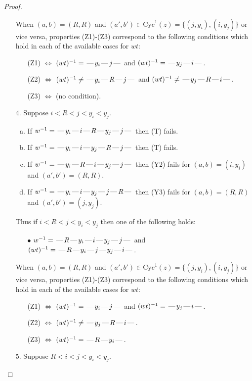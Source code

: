 \documentclass[10pt]{article}
\theoremstyle{definition}
\theoremstyle{definition}
\def\dash{\text{\hspace{0.5mm}---\hspace{0.5mm}}}
\def\Cyc{\mathrm{Cyc}}
\begin{document}
\begin{proof}
\begin{enumerate}
\begin{enumerate}
\end{enumerate}
When $(a,b)= (R,R)$ and $(a',b')\in \Cyc^1(z)=\{(j,y_i),(i,y_j)\}$ or vice versa,
properties (Z1)-(Z3) correspond to the following conditions which
hold in each of the available cases for $wt$:
\begin{enumerate}
\item[](Z1) $\Leftrightarrow$ $(wt)^{-1} = \dash y_i \dash j \dash$  and $(wt)^{-1} = \dash y_j \dash i \dash$.
\item[](Z2) $\Leftrightarrow$ $(wt)^{-1} \neq \dash y_i \dash R \dash j \dash$  and $(wt)^{-1} \neq \dash y_j \dash R \dash i \dash$.
\item[](Z3) $\Leftrightarrow$ (no condition).
\end{enumerate}
\item[$4$.] Suppose $i < R < j < y_i < y_j$.
\begin{enumerate}[(a)]
\item If $w^{-1} = \dash y_i\dash i\dash R\dash y_j\dash j\dash $ then (T) fails.
\item If $w^{-1} = \dash y_i\dash i\dash y_j\dash R\dash j\dash $ then (T) fails.
\item If $w^{-1} = \dash y_i\dash R\dash i\dash y_j\dash j\dash $ then (Y2) fails for $(a,b)=(i,y_i)$ and $(a',b')=(R,R)$.
\item If $w^{-1} = \dash y_i\dash i\dash y_j\dash j\dash R\dash $ then (Y3) fails for $(a,b)=(R,R)$ and $(a',b')=(j,y_j)$.
\end{enumerate}
Thus if $i < R < j < y_i < y_j$ then one of the following holds:
\begin{enumerate}
\item[$\bullet$] $w^{-1} = \dash R\dash y_i\dash i\dash y_j\dash j\dash $ and $(wt)^{-1} = \dash R\dash y_i\dash j\dash y_j\dash i\dash $.
\end{enumerate}
When $(a,b)= (R,R)$ and $(a',b')\in \Cyc^1(z)=\{(j,y_i),(i,y_j)\}$ or vice versa,
properties (Z1)-(Z3) correspond to the following conditions which
hold in each of the available cases for $wt$:
\begin{enumerate}
\item[](Z1) $\Leftrightarrow$ $(wt)^{-1} = \dash y_i \dash j \dash$  and $(wt)^{-1} = \dash y_j \dash i \dash$.
\item[](Z2) $\Leftrightarrow$ $(wt)^{-1} \neq \dash y_j \dash R \dash i \dash$.
\item[](Z3) $\Leftrightarrow$ $(wt)^{-1} = \dash R \dash y_i \dash$.
\end{enumerate}
\item[$5$.] Suppose $R < i < j < y_i < y_j$.

\end{enumerate}
\end{proof}
\end{document}

